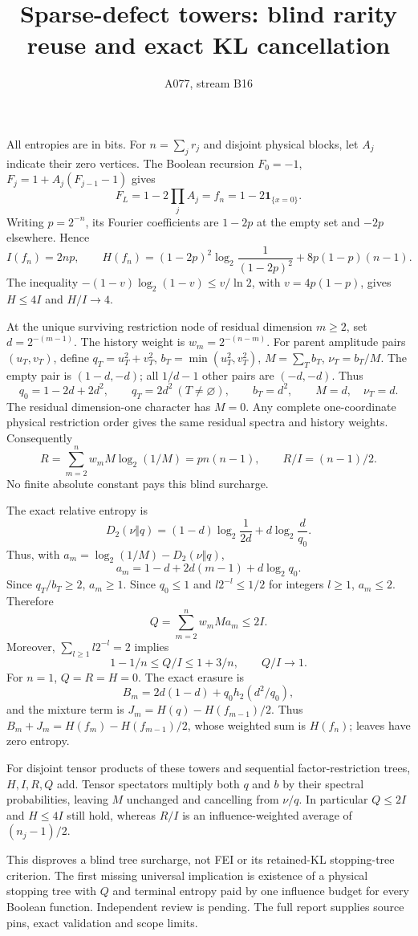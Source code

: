 \documentclass{article}
\begin{document}
\title{Sparse-defect towers: blind rarity reuse and exact KL cancellation}
\author{A077, stream B16}\maketitle
All entropies are in bits. For $n=\sum_j r_j$ and disjoint physical blocks, let $A_j$ indicate their zero vertices. The Boolean recursion $F_0=-1$, $F_j=1+A_j(F_{j-1}-1)$ gives
\[F_L=1-2\prod_j A_j=f_n=1-2\mathbf1_{\{x=0\}}.\]
Writing $p=2^{-n}$, its Fourier coefficients are $1-2p$ at the empty set and $-2p$ elsewhere. Hence
\[ I(f_n)=2np,\qquad H(f_n)=(1-2p)^2\log_2\frac1{(1-2p)^2}+8p(1-p)(n-1).\]
The inequality $-(1-v)\log_2(1-v)\le v/\ln2$, with $v=4p(1-p)$, gives $H\le4I$ and $H/I\to4$.

At the unique surviving restriction node of residual dimension $m\ge2$, set $d=2^{-(m-1)}$. The history weight is $w_m=2^{-(n-m)}$. For parent amplitude pairs $(u_T,v_T)$, define $q_T=u_T^2+v_T^2$, $b_T=\min(u_T^2,v_T^2)$, $M=\sum_T b_T$, $\nu_T=b_T/M$. The empty pair is $(1-d,-d)$; all $1/d-1$ other pairs are $(-d,-d)$. Thus
\[q_0=1-2d+2d^2,\qquad q_T=2d^2\ (T\ne\varnothing),\qquad b_T=d^2,\qquad M=d,\quad \nu_T=d.\]
The residual dimension-one character has $M=0$. Any complete one-coordinate physical restriction order gives the same residual spectra and history weights. Consequently
\[ R=\sum_{m=2}^n w_mM\log_2(1/M)=p n(n-1),\qquad R/I=(n-1)/2.\]
No finite absolute constant pays this blind surcharge.

The exact relative entropy is
\[D_2(\nu\Vert q)=(1-d)\log_2\frac1{2d}+d\log_2\frac d{q_0}.\]
Thus, with $a_m=\log_2(1/M)-D_2(\nu\Vert q)$,
\[a_m=1-d+2d(m-1)+d\log_2q_0.\]
Since $q_T/b_T\ge2$, $a_m\ge1$. Since $q_0\le1$ and $l2^{-l}\le1/2$ for integers $l\ge1$, $a_m\le2$. Therefore
\[Q=\sum_{m=2}^nw_mMa_m\le2I.\]
Moreover, $\sum_{l\ge1}l2^{-l}=2$ implies
\[1-1/n\le Q/I\le1+3/n,\qquad Q/I\longrightarrow1.\]
For $n=1$, $Q=R=H=0$. The exact erasure is
\[ B_m=2d(1-d)+q_0h_2(d^2/q_0),\]
and the mixture term is $J_m=H(q)-H(f_{m-1})/2$. Thus $B_m+J_m=H(f_m)-H(f_{m-1})/2$, whose weighted sum is $H(f_n)$; leaves have zero entropy.

For disjoint tensor products of these towers and sequential factor-restriction trees, $H,I,R,Q$ add. Tensor spectators multiply both $q$ and $b$ by their spectral probabilities, leaving $M$ unchanged and cancelling from $\nu/q$. In particular $Q\le2I$ and $H\le4I$ still hold, whereas $R/I$ is an influence-weighted average of $(n_j-1)/2$.

This disproves a blind tree surcharge, not FEI or its retained-KL stopping-tree criterion. The first missing universal implication is existence of a physical stopping tree with $Q$ and terminal entropy paid by one influence budget for every Boolean function. Independent review is pending. The full report supplies source pins, exact validation and scope limits.
\end{document}
